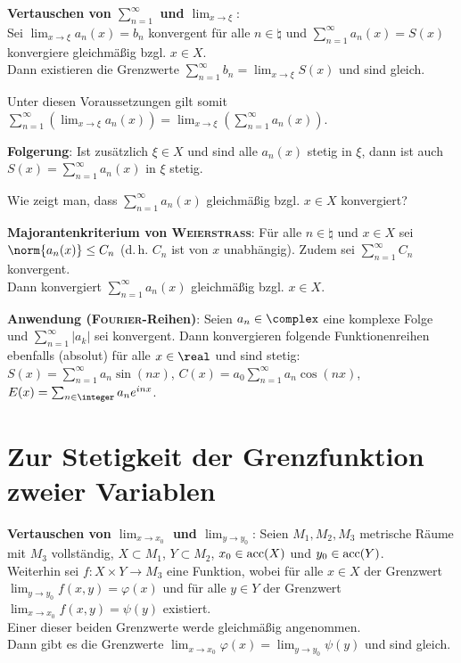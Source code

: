 \textbf{Vertauschen von $\sum_{n=1}^\infty$ und $\lim_{x \to \xi}$}: \\
Sei $\lim_{x \to \xi} a_n(x) = b_n$ konvergent für alle $n \in \natural$ und
$\sum_{n=1}^\infty a_n(x) = S(x)$ konvergiere gleichmäßig bzgl. $x \in X$. \\
Dann existieren die Grenzwerte
$\sum_{n=1}^\infty b_n = \lim_{x \to \xi} S(x)$ und sind gleich.

Unter diesen Voraussetzungen gilt somit
$\sum_{n=1}^\infty \left(\lim_{x \to \xi} a_n(x)\right) =
\lim_{x \to \xi} \left(\sum_{n=1}^\infty a_n(x)\right)$.

\textbf{Folgerung}: Ist zusätzlich $\xi \in X$ und sind alle $a_n(x)$
stetig in $\xi$, dann ist auch \\
$S(x) = \sum_{n=1}^\infty a_n(x)$ in $\xi$ stetig.

\linie

Wie zeigt man, dass $\sum_{n=1}^\infty a_n(x)$ gleichmäßig bzgl. $x \in X$
konvergiert?

\textbf{Majorantenkriterium von \textsc{Weierstraß}}:
Für alle $n \in \natural$ und $x \in X$ sei $\norm{a_n(x)} \le C_n$
(d.\,h. $C_n$ ist von $x$ unabhängig).
Zudem sei $\sum_{n=1}^\infty C_n$ konvergent. \\
Dann konvergiert $\sum_{n=1}^\infty a_n(x)$ gleichmäßig bzgl. $x \in X$.

\textbf{Anwendung (\textsc{Fourier}-Reihen)}:
Seien $a_n \in \complex$ eine komplexe Folge und $\sum_{n=1}^\infty |a_k|$
sei konvergent.
Dann konvergieren folgende Funktionenreihen ebenfalls (absolut) für alle
$x \in \real$ und sind stetig:
$S(x) = \sum_{n=1}^\infty a_n \sin(nx)$,
$C(x) = a_0 \sum_{n=1}^\infty a_n \cos(nx)$,
$E(x) = \sum_{n \in \integer} a_n e^{inx}$.

\pagebreak

\section{%
    Zur Stetigkeit der Grenzfunktion zweier Variablen%
}

\textbf{Vertauschen von $\lim_{x \to x_0}$ und $\lim_{y \to y_0}$}:
Seien $M_1, M_2, M_3$ metrische Räume mit $M_3$ vollständig,
$X \subset M_1$, $Y \subset M_2$, $x_0 \in \operatorname{acc}(X)$ und $y_0 \in \operatorname{acc}(Y)$. \\
Weiterhin sei $f: X \times Y \rightarrow M_3$ eine Funktion, wobei
für alle $x \in X$ der Grenzwert \\
$\lim_{y \to y_0} f(x, y) = \varphi(x)$
und für alle $y \in Y$ der Grenzwert $\lim_{x \to x_0} f(x, y) = \psi(y)$
existiert. \\
Einer dieser beiden Grenzwerte werde gleichmäßig angenommen. \\
Dann gibt es die Grenzwerte
$\lim_{x \to x_0} \varphi(x) = \lim_{y \to y_0} \psi(y)$ und sind gleich.

